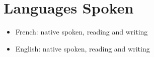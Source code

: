 \documentclass[letterpaper]{twentysecondcv} %
\begin{document}

\section{Languages Spoken}

\begin{itemize}
	\item French: native spoken, reading and writing
	\item English: native spoken, reading and writing
\end{itemize}


\newpage %
\makeprofile %



\end{document}
